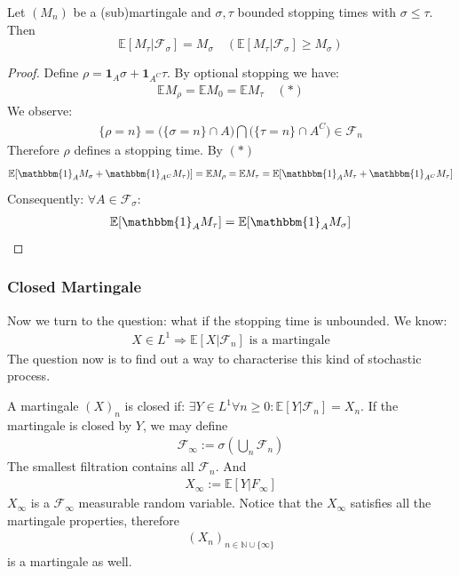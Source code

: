 \begin{theorem}
	Let $(M_n)$ be a (sub)martingale and $\sigma, \tau$ bounded stopping times with $\sigma \leq \tau$. Then
	\begin{equation*}
		\mathbb{E}[M_\tau| \mathcal{F}_\sigma] = M_\sigma \quad (\mathbb{E}[M_\tau| \mathcal{F}_\sigma] \geq M_\sigma)
	\end{equation*}
\end{theorem}
\begin{proof}
	Define $\rho = \mathbf{1}_A \sigma + \mathbf{1}_{A^C} \tau$. By optional stopping we have:
	\begin{align*}
		\mathbb{E} M_\rho = \mathbb{E} M_0 = \mathbb{E} M_\tau \quad(*)
	\end{align*}
	We observe:
	\begin{align*}
		\{\rho = n \} = \bigg(\{\sigma = n\}\cap A \bigg)\bigcap\bigg(\{\tau = n\} \cap A^C\bigg) \in \mathcal{F}_n
	\end{align*}
	Therefore $\rho$ defines a stopping time. By $(*)$ 
	\begin{align*}
		 \mathbb{E}[\mathbbm{1}_{A}M_\sigma + \mathbbm{1}_{A^C} M_\tau)]  = \mathbb{E}M_\rho =
		 \mathbb{E}M_\tau = \mathbb{E}[\mathbbm{1}_{A}M_\tau + \mathbbm{1}_{A^C} M_\tau]
	\end{align*}
		Consequently: $\forall A \in \mathcal{F}_\sigma:$
	\begin{align*}
		\mathbb{E}[\mathbbm{1}_{A} M_\tau ] = \mathbb{E}[\mathbbm{1}_{A}M_\sigma]
	\end{align*}

\end{proof}


\subsubsection*{Closed Martingale}
Now we turn to the question: what if the stopping time is unbounded.
We know:
\begin{align*}
 X \in L^1 \Rightarrow \mathbb{E}[X|\mathcal{F}_n]	\text{ is a martingale}
\end{align*}
The question now is to find out a way to characterise this kind of stochastic process.

\begin{definition}
A martingale $(X)_n$ is closed if:
$\exists Y \in L^1 \forall n \geq 0: \mathbb{E}[Y|\mathcal{F}_n] = X_n$. 
If the martingale is closed by $Y$, we may define
\begin{align*}
	\mathcal{F}_\infty := \sigma(\bigcup_n \mathcal{F}_n)
\end{align*}
The smallest filtration contains all $\mathcal{F}_n$. And
\begin{align*}
		X_\infty:= \mathbb{E}[Y|F_\infty]
\end{align*}
$X_\infty$ is a $\mathcal{F}_\infty$ measurable random variable. Notice that the $X_\infty$ satisfies all the martingale properties, therefore
\begin{align*}
	(X_n)_{ n \in \mathbb{N} \cup \{\infty\}}
\end{align*}
is a martingale as well. 
\end{definition}

